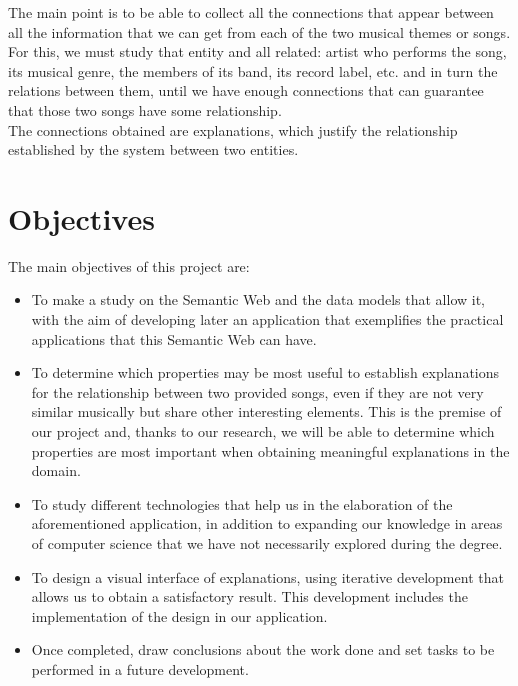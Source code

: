 The main point is to be able to collect all the connections that appear between all the information that we can get from each of the two musical themes or songs. For this, we must study that entity and all related: artist who performs the song, its musical genre, the members of its band, its record label, etc. and in turn the relations between them, until we have enough connections that can guarantee that those two songs have some relationship.\\

The connections obtained are explanations, which justify the relationship established by the system between two entities.\\

\section{Objectives}

The main objectives of this project are:

\begin{itemize}
\item To make a study on the Semantic Web and the data models that allow it, with the aim of developing later an application that exemplifies the practical applications that this Semantic Web can have.\\

\item To determine which properties may be most useful to establish explanations for the relationship between two provided songs, even if they are not very similar musically but share other interesting elements. This is the premise of our project and, thanks to our research, we will be able to determine which properties are most important when obtaining meaningful explanations in the domain.\\

\item To study different technologies that help us in the elaboration of the aforementioned application, in addition to expanding our knowledge in areas of computer science that we have not necessarily explored during the degree.\\

\item To design a visual interface of explanations, using iterative development that allows us to obtain a satisfactory result. This development includes the implementation of the design in our application.\\

\item Once completed, draw conclusions about the work done and set tasks to be performed in a future development.\\
\end{itemize}

